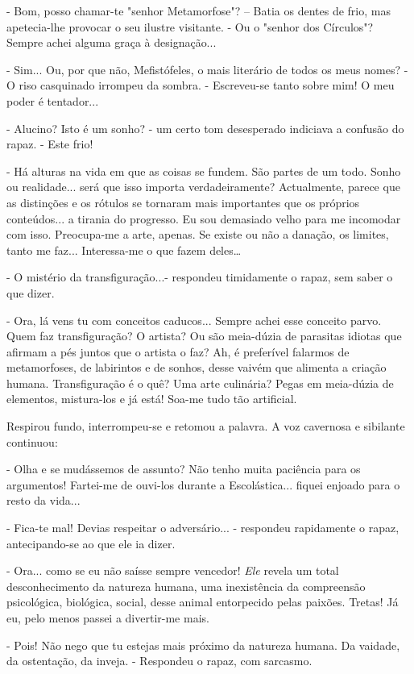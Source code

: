 - Bom, posso chamar-te "senhor Metamorfose"? -- Batia os dentes de frio,
mas apetecia-lhe provocar o seu ilustre visitante. - Ou o "senhor dos
Círculos"? Sempre achei alguma graça à designação...

- Sim... Ou, por que não, Mefistófeles, o mais literário de todos os
meus nomes? - O riso casquinado irrompeu da sombra. - Escreveu-se tanto
sobre mim! O meu poder é tentador...

- Alucino? Isto é um sonho? - um certo tom desesperado indiciava a
confusão do rapaz. - Este frio!

- Há alturas na vida em que as coisas se fundem. São partes de um todo.
Sonho ou realidade... será que isso importa verdadeiramente?
Actualmente, parece que as distinções e os rótulos se tornaram mais
importantes que os próprios conteúdos... a tirania do progresso. Eu sou
demasiado velho para me incomodar com isso. Preocupa-me a arte, apenas.
Se existe ou não a danação, os limites, tanto me faz... Interessa-me o
que fazem deles\ldots{}

- O mistério da transfiguração...- respondeu timidamente o rapaz, sem
saber o que dizer.

- Ora, lá vens tu com conceitos caducos... Sempre achei esse conceito
parvo. Quem faz transfiguração? O artista? Ou são meia-dúzia de
parasitas idiotas que afirmam a pés juntos que o artista o faz? Ah, é
preferível falarmos de metamorfoses, de labirintos e de sonhos, desse
vaivém que alimenta a criação humana. Transfiguração é o quê? Uma arte
culinária? Pegas em meia-dúzia de elementos, mistura-los e já está!
Soa-me tudo tão artificial.

Respirou fundo, interrompeu-se e retomou a palavra. A voz cavernosa e
sibilante continuou:

- Olha e se mudássemos de assunto? Não tenho muita paciência para os
argumentos! Fartei-me de ouvi-los durante a Escolástica... fiquei
enjoado para o resto da vida...

- Fica-te mal! Devias respeitar o adversário... - respondeu rapidamente
o rapaz, antecipando-se ao que ele ia dizer.

- Ora... como se eu não saísse sempre vencedor! \emph{Ele} revela um
total desconhecimento da natureza humana, uma inexistência da
compreensão psicológica, biológica, social, desse animal entorpecido
pelas paixões. Tretas! Já eu, pelo menos passei a divertir-me mais.

- Pois! Não nego que tu estejas mais próximo da natureza humana. Da
vaidade, da ostentação, da inveja. - Respondeu o rapaz, com sarcasmo.

